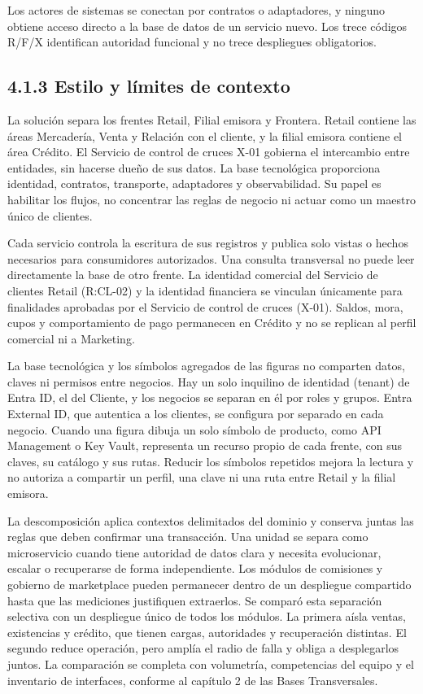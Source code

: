 \documentclass[11pt]{article}
\begin{document}
Los actores de sistemas se conectan por contratos o adaptadores, y ninguno obtiene acceso directo a la base de datos de un servicio nuevo. Los trece códigos R/F/X identifican autoridad funcional y no trece despliegues obligatorios.

\subsection{4.1.3 Estilo y límites de contexto}

La solución separa los frentes Retail, Filial emisora y Frontera. Retail contiene las áreas Mercadería, Venta y Relación con el cliente, y la filial emisora contiene el área Crédito. El Servicio de control de cruces X-01 gobierna el intercambio entre entidades, sin hacerse dueño de sus datos. La base tecnológica proporciona identidad, contratos, transporte, adaptadores y observabilidad. Su papel es habilitar los flujos, no concentrar las reglas de negocio ni actuar como un maestro único de clientes.

Cada servicio controla la escritura de sus registros y publica solo vistas o hechos necesarios para consumidores autorizados. Una consulta transversal no puede leer directamente la base de otro frente. La identidad comercial del Servicio de clientes Retail (R:CL-02) y la identidad financiera se vinculan únicamente para finalidades aprobadas por el Servicio de control de cruces (X-01). Saldos, mora, cupos y comportamiento de pago permanecen en Crédito y no se replican al perfil comercial ni a Marketing.

La base tecnológica y los símbolos agregados de las figuras no comparten datos, claves ni permisos entre negocios. Hay un solo inquilino de identidad (tenant) de Entra ID, el del Cliente, y los negocios se separan en él por roles y grupos. Entra External ID, que autentica a los clientes, se configura por separado en cada negocio. Cuando una figura dibuja un solo símbolo de producto, como API Management o Key Vault, representa un recurso propio de cada frente, con sus claves, su catálogo y sus rutas. Reducir los símbolos repetidos mejora la lectura y no autoriza a compartir un perfil, una clave ni una ruta entre Retail y la filial emisora.

La descomposición aplica contextos delimitados del dominio y conserva juntas las reglas que deben confirmar una transacción. Una unidad se separa como microservicio cuando tiene autoridad de datos clara y necesita evolucionar, escalar o recuperarse de forma independiente. Los módulos de comisiones y gobierno de marketplace pueden permanecer dentro de un despliegue compartido hasta que las mediciones justifiquen extraerlos. Se comparó esta separación selectiva con un despliegue único de todos los módulos. La primera aísla ventas, existencias y crédito, que tienen cargas, autoridades y recuperación distintas. El segundo reduce operación, pero amplía el radio de falla y obliga a desplegarlos juntos. La comparación se completa con volumetría, competencias del equipo y el inventario de interfaces, conforme al capítulo 2 de las Bases Transversales.
\end{document}

